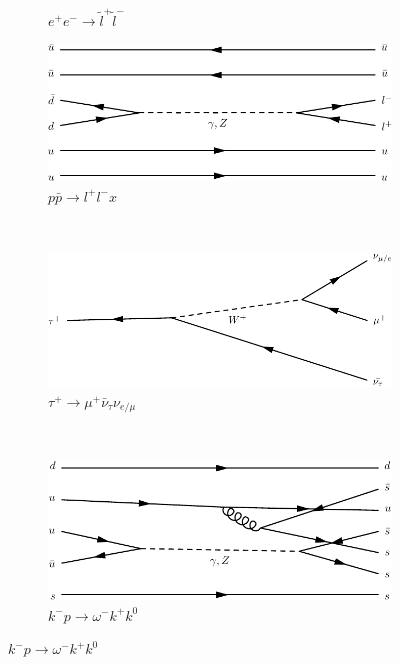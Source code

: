 \begin{figure}[h]
\begin{subfigure}[b]{0.3\textwidth}
    \caption{$e^+e^-\rightarrow \tilde{l}^+\tilde{l}^-$}
    \label{fey:3}
  \end{subfigure}
  \newline
  \newline
  \begin{subfigure}[b]{0.3\textwidth}
    \includegraphics[width=\textwidth]{../dia/04.pdf}
    \caption{$p\bar{p}\rightarrow l^+l^-x$}
    \label{fey:4}
  \end{subfigure}%
  ~
  \begin{subfigure}[b]{0.3\textwidth}
    \includegraphics[width=\textwidth]{../dia/05.pdf}
    \caption{$\tau^+\rightarrow \mu^+\bar{\nu}_{\tau}\nu_{e/\mu}$}
    \label{fey:5}
  \end{subfigure}%
  ~
  \begin{subfigure}[b]{0.3\textwidth}
    \includegraphics[width=\textwidth]{../dia/06.pdf}
    \caption{$k^-p\rightarrow \omega^-k^+k^0$}
    \label{fey:6}
  \end{subfigure}

\end{figure}
